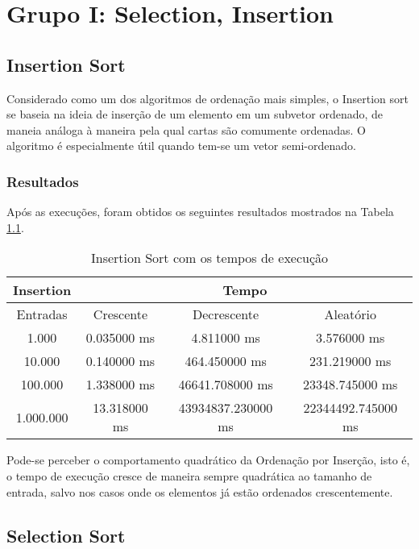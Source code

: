 \documentclass[
	12pt,				%
	openany,
	a4paper,			%
	english,			%
	french,				%
	spanish,			%
	brazil,				%
	]{abntex2}
\begin{document}
\chapter{Grupo I: Selection, Insertion}
    \section{Insertion Sort}
    
    	Considerado como um dos algoritmos de ordenação mais simples, o Insertion sort se baseia na ideia de inserção de um elemento em um subvetor ordenado, de maneia análoga à maneira pela qual cartas são comumente ordenadas. O algoritmo é especialmente útil quando tem-se um vetor semi-ordenado. 
    
    	\subsection{Resultados}
    	
    	Após as execuções, foram obtidos os seguintes resultados mostrados na Tabela \ref{tab:insertion}.
    	
    	\begin{table}[htb]
\centering
\begin{tabular}{|c|c|c|c|}
\hline
Insertion & \multicolumn{3}{c|}{Tempo}                             \\ \hline
Entradas  & Crescente    & Decrescente        & Aleatório          \\ \hline
1.000     & 0.035000 ms  & 4.811000 ms        & 3.576000 ms        \\ \hline
10.000    & 0.140000 ms  & 464.450000 ms      & 231.219000 ms      \\ \hline
100.000   & 1.338000 ms  & 46641.708000 ms    & 23348.745000 ms    \\ \hline
1.000.000 & 13.318000 ms & 43934837.230000 ms & 22344492.745000 ms \\ \hline
\end{tabular}
\caption{Insertion Sort com os tempos de execução}
\label{tab:insertion}
\end{table}
    
    Pode-se perceber o comportamento quadrático da Ordenação por Inserção, isto é, o tempo de execução cresce de maneira sempre quadrática ao tamanho de entrada, salvo nos casos onde os elementos já estão ordenados crescentemente.
        
    \section{Selection Sort}
    
\end{document}

